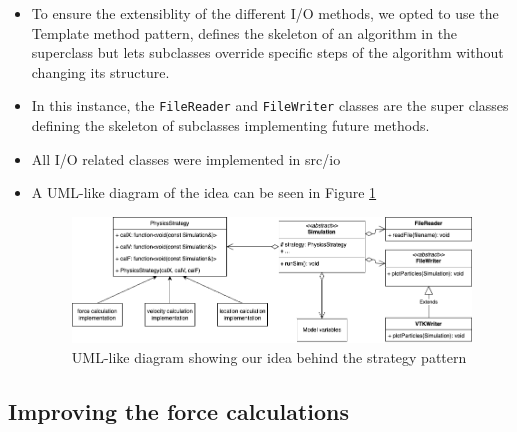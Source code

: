 \documentclass{article}
\begin{document}
\begin{itemize}
    \item To ensure the extensiblity of the different I/O methods, we opted to use the Template method pattern,  defines the skeleton of an algorithm in the superclass but lets subclasses override specific steps of the algorithm without changing its structure.
    \item In this instance, the \verb|FileReader| and \verb|FileWriter| classes are the super classes defining the skeleton of subclasses implementing future methods. 
    \item All I/O related classes were implemented in src/io

    \item A UML-like diagram of the idea can be seen in Figure \ref{fig:strat}
    \begin{figure}[H]
        \includegraphics[width=\textwidth]{res/strategy_long.png}
        \caption{UML-like diagram showing our idea behind the strategy pattern}
        \label{fig:strat}
    \end{figure}

\end{itemize}

\subsection{Improving the force calculations}
\label{sec:Refactoring:forceimprovements}
\end{document}
